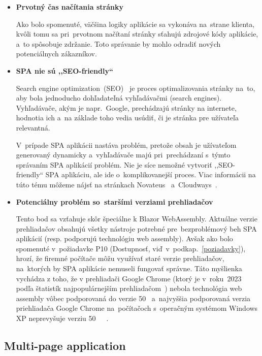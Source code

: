 \begin{itemize}
\item \textbf{Prvotný čas načítania stránky}

Ako bolo spomenuté, väčšina logiky aplikácie sa vykonáva na~strane klienta, kvôli tomu sa pri~prvotnom načítaní stránky sťahujú zdrojové kódy aplikácie, a~to spôsobuje zdržanie. Toto správanie by mohlo odradiť nových potenciálnych zákazníkov.

\item \textbf{SPA nie sú ,,SEO-friendly``}

Search engine optimization~(SEO)~\cite{seo} je proces optimalizovania stránky na~to, aby bola jednoducho dohľadateľná vyhľadávačmi (search engines). Vyhľadávače, akým je napr.~Google, prechádzajú stránky na internete, hodnotia ich a~na základe toho vedia usúdiť, či je stránka pre užívateľa relevantná.

V~prípade SPA aplikácii nastáva problém, pretože obsah je užívateľom generovaný dynamicky a~vyhľadávače majú pri~prechádzaní s~týmto správaním SPA aplikácií problém. Nie je síce nemožné vytvoriť ,,SEO-friendly`` SPA aplikáciu, ale ide o~komplikovanejší proces. Viac informácii na túto tému môžeme nájsť na stránkach Novateus~\cite{novateus} a~Cloudways~\cite{cloudways}.

\item \textbf{Potenciálny problém so~staršími verziami prehliadačov}

Tento bod sa vzťahuje skôr špeciálne k Blazor WebAssembly. Aktuálne verzie prehliadačov obsahujú všetky nástroje potrebné pre~bezproblémový beh SPA aplikácií (resp. podporujú technológiu web assembly). Avšak ako bolo spomenuté v~požiadavke P10 (Dostupnosť, viď~v~podkap.~\ref{poziadavky}), hrozí, že firemné počítače môžu využívať staré verzie prehliadačov, na~ktorých by SPA aplikácie nemuseli fungovať správne. Táto myšlienka vychádza z toho, že v prehliadači Google Chrome (ktorý je v~roku~2023 podľa štatistík najpopulárnejším prehliadačom~\cite{stats}) nebola technológia web assembly vôbec podporovaná do verzie 50~\cite{wa support} a~najvyššia podporovaná verzia priehliadača Google Chrome na~počítačoch s~operačným systémom Windows XP neprevyšuje verziu 50~\cite{chromexpver1}~\cite{chromexpver2}~\cite{chromexpver3}.
\end{itemize}

\subsection{Multi-page application}
\label{multi page application}

